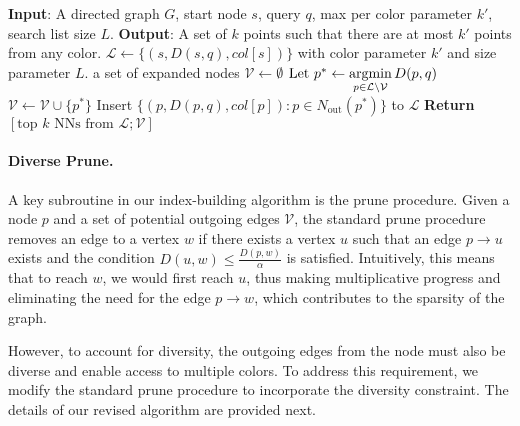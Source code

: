 \begin{algorithm}
\caption{$\diversesearch(G,s,q,k',k,L)$}
\label{alg:color_search}
\begin{algorithmic}[1]
\STATE \textbf{Input}: A directed graph $G$, start node $s$, query $q$, max per color parameter $k'$, search list size $L$.
\STATE \textbf{Output}: A set of $k$ points such that there are at most $k'$ points from any color.
 \diversequeue $\mathcal{L} \leftarrow \{(s,D(s,q),col[s]) \}$ with color parameter $k'$ and size parameter $L$.  
 a set of expanded nodes $\mathcal{V} \leftarrow \emptyset$\;
        \STATE $\text{Let } p^{*} \leftarrow \operatorname*{argmin}\limits_{p \in \mathcal{L} \setminus \mathcal{V}} D(p,q)$\;
        \STATE $\mathcal{V} \leftarrow \mathcal{V} \cup \{p^{*}\}$\;
        \STATE Insert $\{\left(p, D(p,q), col[p]\right):p \in N_{\text{out}}(p^*)\}$ to $\mathcal{L}$\;
\ENDWHILE
\STATE \textbf{Return} $[\text{top } k \text{ NNs from } \mathcal{L}; \mathcal{V}]$\;
\end{algorithmic}
\end{algorithm}



\paragraph{Diverse Prune.} A key subroutine in our index-building algorithm is the prune procedure. Given a node $p$ and a set of potential outgoing edges $\mathcal{V}$, the standard prune procedure removes an edge to a vertex \(w\) if there exists a vertex \(u\) such that an edge \(p \rightarrow u\) exists and the condition \(D(u, w) \leq \frac{D(p, w)}{\alpha}\) is satisfied. Intuitively, this means that to reach \(w\), we would first reach \(u\), thus making multiplicative progress and eliminating the need for the edge \(p \rightarrow w\), which contributes to the sparsity of the graph.

However, to account for diversity, the outgoing edges from the node must also be diverse and enable access to multiple colors. To address this requirement, we modify the standard prune procedure to incorporate the diversity constraint. The details of our revised algorithm are provided next.

